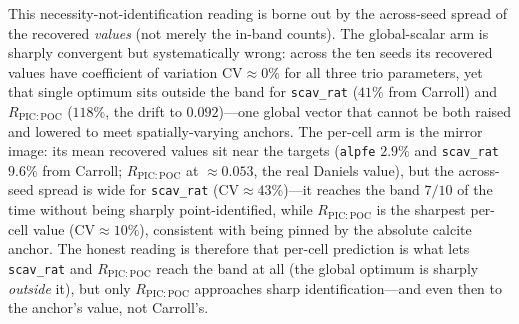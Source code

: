 \documentclass[11pt]{article}
\begin{document}
This necessity-not-identification reading is borne out by the across-seed spread
of the recovered \emph{values} (not merely the in-band counts). The global-scalar
arm is sharply convergent but systematically wrong: across the ten seeds its
recovered values have coefficient of variation $\mathrm{CV}\approx0\%$ for all
three trio parameters, yet that single optimum sits outside the band for
\texttt{scav\_rat} ($41\%$ from Carroll) and $R_{\mathrm{PIC:POC}}$ ($118\%$, the
drift to $0.092$)---one global vector that cannot be both raised and lowered to
meet spatially-varying anchors. The per-cell arm is the mirror image: its mean
recovered values sit near the targets (\texttt{alpfe} $2.9\%$ and \texttt{scav\_rat}
$9.6\%$ from Carroll; $R_{\mathrm{PIC:POC}}$ at $\approx0.053$, the real Daniels
value), but the across-seed spread is wide for \texttt{scav\_rat}
($\mathrm{CV}\approx43\%$)---it reaches the band $7/10$ of the time without being
sharply point-identified, while $R_{\mathrm{PIC:POC}}$ is the sharpest per-cell
value ($\mathrm{CV}\approx10\%$), consistent with being pinned by the absolute
calcite anchor. The honest reading is therefore that per-cell prediction is what
lets \texttt{scav\_rat} and $R_{\mathrm{PIC:POC}}$ reach the band at all (the
global optimum is sharply \emph{outside} it), but only $R_{\mathrm{PIC:POC}}$
approaches sharp identification---and even then to the anchor's value, not
Carroll's.
\end{document}
